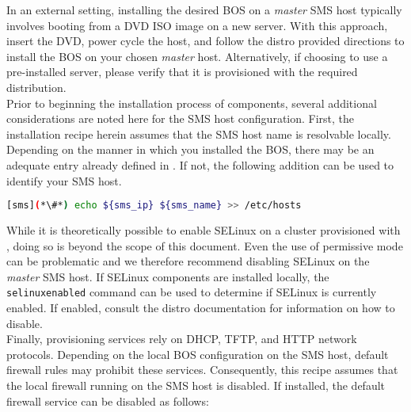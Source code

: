 In an external setting, installing the desired BOS on a
{\em master} SMS host typically involves booting from a DVD ISO image on a new
server. With this approach, insert the \baseOS{} DVD, power cycle the host, and
follow the distro provided directions to install the BOS on your chosen {\em
master} host.  Alternatively, if choosing to use a pre-installed server, please
verify that it is provisioned with the required \baseOS{} distribution. \\

Prior to beginning the installation process of \OHPC{} components, several additional
considerations are noted here for the SMS host configuration. First,
the installation recipe herein assumes that
the SMS host name is resolvable locally. Depending on the manner in which you
installed the BOS, there may be an adequate entry already defined
in . If not, the following addition can be used to identify
your SMS host.
\begin{lstlisting}[language=bash,keywords={}]
[sms](*\#*) echo ${sms_ip} ${sms_name} >> /etc/hosts
\end{lstlisting}

While it is theoretically possible to enable SELinux on a cluster provisioned
with \provisioner{},
doing so is beyond the scope of this document. Even the use of
permissive mode can be problematic and we therefore recommend disabling SELinux on the {\em
master} SMS host. If SELinux components are installed locally,
the \texttt{selinuxenabled} command can be used to determine if SELinux is
currently enabled. If enabled, consult the distro documentation for information
on how to disable. \\

Finally, provisioning services rely on DHCP, TFTP, and HTTP network protocols.
Depending on the local BOS configuration on the SMS host, default firewall
rules may prohibit these services. Consequently, this recipe assumes that the local
firewall running on the SMS host is disabled. If installed, the default
firewall service can be disabled as follows:

